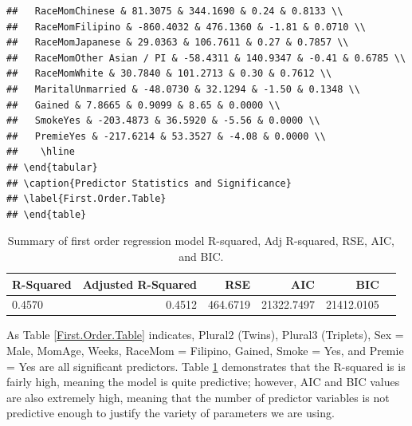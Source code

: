 \documentclass{article}\usepackage[]{graphicx}\usepackage[]{xcolor}
\makeatletter
\newenvironment{kframe}{%
 \def\at@end@of@kframe{}%
 \ifinner\ifhmode%
  \def\at@end@of@kframe{\end{minipage}}%
  \begin{minipage}{\columnwidth}%
 \fi\fi%
 \def\FrameCommand##1{\hskip\@totalleftmargin \hskip-\fboxsep
 \colorbox{shadecolor}{##1}\hskip-\fboxsep
     \hskip-\linewidth \hskip-\@totalleftmargin \hskip\columnwidth}%
 \MakeFramed {\advance\hsize-\width
   \@totalleftmargin\z@ \linewidth\hsize
   \@setminipage}}%
 {\par\unskip\endMakeFramed%
 \at@end@of@kframe}
\newenvironment{knitrout}{}{} %
\makeatother
\begin{document}
\begin{knitrout}
\begin{kframe}
\begin{verbatim}
##   RaceMomChinese & 81.3075 & 344.1690 & 0.24 & 0.8133 \\ 
##   RaceMomFilipino & -860.4032 & 476.1360 & -1.81 & 0.0710 \\ 
##   RaceMomJapanese & 29.0363 & 106.7611 & 0.27 & 0.7857 \\ 
##   RaceMomOther Asian / PI & -58.4311 & 140.9347 & -0.41 & 0.6785 \\ 
##   RaceMomWhite & 30.7840 & 101.2713 & 0.30 & 0.7612 \\ 
##   MaritalUnmarried & -48.0730 & 32.1294 & -1.50 & 0.1348 \\ 
##   Gained & 7.8665 & 0.9099 & 8.65 & 0.0000 \\ 
##   SmokeYes & -203.4873 & 36.5920 & -5.56 & 0.0000 \\ 
##   PremieYes & -217.6214 & 53.3527 & -4.08 & 0.0000 \\ 
##    \hline
## \end{tabular}
## \caption{Predictor Statistics and Significance} 
## \label{First.Order.Table}
## \end{table}
\end{verbatim}
\end{kframe}
\end{knitrout}

\begin{table}[ht]
\centering
\begin{tabular}{lrrrrr}
  \hline
R-Squared & Adjusted R-Squared & RSE & AIC & BIC\\ 
  \hline
   0.4570 & 0.4512 & 464.6719 & 21322.7497 & 21412.0105 \\ 
   \hline
\end{tabular}
\caption{Summary of first order regression model R-squared, Adj R-squared, RSE, AIC, and BIC.}
\label{first.order.summary}
\end{table}

As Table \ref{First.Order.Table} indicates, Plural2 (Twins), Plural3 (Triplets), Sex = Male, MomAge, Weeks, RaceMom = Filipino, Gained, Smoke = Yes, and Premie = Yes are all significant predictors. Table \ref{first.order.summary} demonstrates that the R-squared is is fairly high, meaning the model is quite predictive; however, AIC and BIC values are also extremely high, meaning that the number of predictor variables is not predictive enough to justify the variety of parameters we are using.
\end{document}
